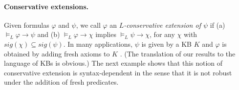 \documentclass[10pt,a4paper]{amsart}
\theoremstyle{plain}
\theoremstyle{definition}
\newcommand{\sig}{\mathit{sig}}
\begin{document}
\paragraph{Conservative extensions.} Given formulas $\varphi$ and $\psi$, we call $\varphi$ an \emph{$L$-conservative extension of $\psi$} if (a) $\models_{L}\varphi \rightarrow \psi$ and (b) $\models_L \varphi \rightarrow \chi$ implies $\models_{L}\psi \rightarrow \chi$, for any $\chi$ with $\sig(\chi)\subseteq \sig(\psi)$. In many applications, $\psi$ is given by a KB $K$ and $\varphi$ is obtained by adding fresh axioms to $K$ \cite{DBLP:conf/kr/GhilardiLW06,AIJ10}. (The translation of our results to the language of KBs is obvious.) The next example shows that this notion of conservative extension is 
syntax-dependent in the sense that it is not robust under the addition of fresh predicates. 
%
\end{document}
